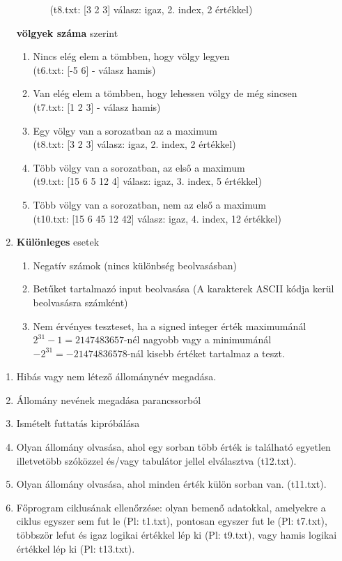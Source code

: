 \documentclass[12pt,a4paper]{article}			%
\begin{document}
\begin{enumerate}
\begin{enumerate}
\begin{itemize}[label={}]
					(t8.txt: [3 2 3] válasz: igaz, 2. index, 2 értékkel)
				\end{itemize}
			\end{enumerate}
			\textbf{völgyek száma} szerint
				\begin{enumerate}
					\item Nincs elég elem a tömbben, hogy völgy legyen\\
					(t6.txt: [-5 6] - válasz hamis)
					\item Van elég elem a tömbben, hogy lehessen völgy de még sincsen\\
					(t7.txt: [1 2 3] - válasz hamis)
					\item Egy völgy van a sorozatban az a maximum\\
					(t8.txt: [3 2 3] válasz: igaz, 2. index, 2 értékkel)
					\item Több völgy van a sorozatban, az első a maximum\\
					(t9.txt: [15 6 5 12 4] válasz: igaz, 3. index, 5 értékkel)
					\item Több völgy van a sorozatban, nem az első a maximum\\
					(t10.txt: [15 6 45 12 42] válasz: igaz, 4. index, 12 értékkel)
				\end{enumerate}
			\item \textbf{Különleges} esetek
				\begin{enumerate}
					\item Negatív számok (nincs különbség beolvasásban)
					\item Betűket tartalmazó input beolvasása (A karakterek ASCII kódja kerül beolvasásra számként)
					\item Nem érvényes teszteset, ha a signed integer érték maximumánál $2^{31}-1=2147483657$-nél nagyobb vagy a minimumánál $-2^{31}=-21474836578$-nál kisebb értéket tartalmaz a teszt.
				\end{enumerate} 
		\end{enumerate}

		\renewcommand{\labelenumi}{\arabic{enumi}.}
		 \vspace{2mm}
		\begin{enumerate}[1, itemsep=0ex]
			\item Hibás vagy nem létező állománynév megadása.
			\item Állomány nevének megadása parancssorból
			\item Ismételt futtatás kipróbálása
			\item Olyan állomány olvasása, ahol egy sorban több érték is található egyetlen illetvetöbb szóközzel és/vagy tabulátor jellel elválasztva (t12.txt).
			\item Olyan állomány olvasása, ahol minden érték külön sorban van. (t11.txt).
			\item Főprogram ciklusának ellenőrzése: olyan bemenő adatokkal, amelyekre a ciklus egyszer sem fut le (Pl: t1.txt), pontosan egyszer fut le (Pl: t7.txt), többször lefut és igaz logikai értékkel lép ki (Pl: t9.txt), vagy hamis logikai értékkel lép ki (Pl: t13.txt).
		\end{enumerate}
\end{document}
